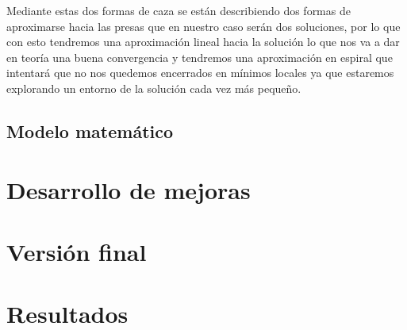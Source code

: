 \documentclass[12pt,a4paper]{article}
\begin{document}
	Mediante estas dos formas de caza se están describiendo dos formas de aproximarse hacia las presas que en nuestro caso serán dos soluciones, por lo que con esto tendremos una aproximación lineal hacia la solución lo que nos va a dar en teoría una buena convergencia y tendremos una aproximación en espiral que intentará que no nos quedemos encerrados en mínimos locales ya que estaremos explorando un entorno de la solución cada vez más pequeño.
	
	\subsection{Modelo matemático}
	
	
	
	\section{Desarrollo de mejoras}
	\label{sec:desarrolloMejoras}
	
	\section{Versión final}
	\label{sec:versionFinal}
	
	\section{Resultados}
	\label{sec:resultados}
	
	
	
	
	\newpage
	
\end{document}
